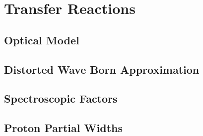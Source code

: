 \section{Transfer Reactions}



\subsection{Optical Model} \label{subsec:Optical_Model}

\subsection{Distorted Wave Born Approximation} \label{subsec:DWBA}




\subsection{Spectroscopic Factors} \label{subsec:C2S}

\subsection{Proton Partial Widths} \label{subsec:PartialWidths}